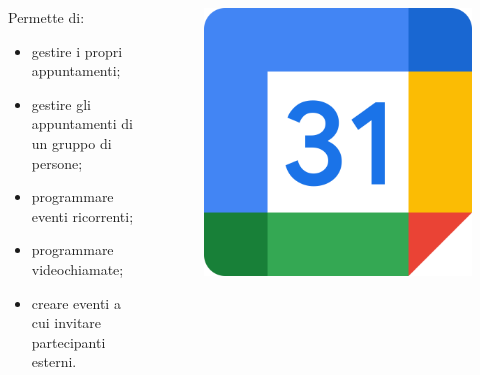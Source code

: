 \documentclass[handout]{beamer}
\begin{document}
\begin{frame}
\begin{columns}
\begin{column}{.7\textwidth}
  Permette di:
  \begin{itemize}
    \item gestire i propri appuntamenti;\pause
    \item gestire gli appuntamenti di un gruppo di persone;\pause
    \item programmare eventi ricorrenti;\pause
    \item programmare videochiamate;\pause
    \item creare eventi a cui invitare partecipanti esterni.
  \end{itemize}  
\end{column}
\begin{column}{.2\textwidth}
  \begin{figure}
    \includegraphics[width=\columnwidth]{img/calendarlogo.png}
  \end{figure}
\end{column}
\end{columns}
\end{frame}
\end{document}
